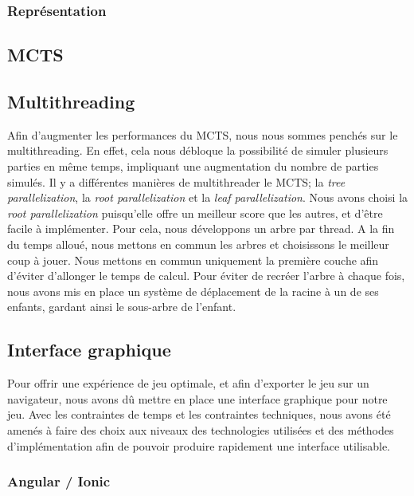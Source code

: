\documentclass[a4paper,11pt]{article}
\begin{document}
\hypertarget{repruxe9sentation}{%
\subsubsection{Représentation}\label{repruxe9sentation}}

\hypertarget{mcts}{%
\subsection{MCTS}\label{mcts}}

\hypertarget{multithreading}{%
\subsection{Multithreading}\label{multithreading}}

Afin d'augmenter les performances du MCTS, nous nous sommes penchés sur
le multithreading. En effet, cela nous débloque la possibilité de
simuler plusieurs parties en même temps, impliquant une augmentation du
nombre de parties simulés. Il y a différentes manières de multithreader
le MCTS; la \emph{tree parallelization}, la \emph{root parallelization}
et la \emph{leaf parallelization}. \citep{patel_blobs_2019} Nous avons
choisi la \emph{root parallelization} puisqu'elle offre un meilleur
score que les autres, et d'être facile à implémenter. Pour cela, nous
développons un arbre par thread. A la fin du temps alloué, nous mettons
en commun les arbres et choisissons le meilleur coup à jouer. Nous
mettons en commun uniquement la première couche afin d'éviter d'allonger
le temps de calcul. Pour éviter de recréer l'arbre à chaque fois, nous
avons mis en place un système de déplacement de la racine à un de ses
enfants, gardant ainsi le sous-arbre de l'enfant.

\hypertarget{interface-graphique}{%
\subsection{Interface graphique}\label{interface-graphique}}

Pour offrir une expérience de jeu optimale, et afin d'exporter le jeu
sur un navigateur, nous avons dû mettre en place une interface graphique
pour notre jeu. Avec les contraintes de temps et les contraintes
techniques, nous avons été amenés à faire des choix aux niveaux des
technologies utilisées et des méthodes d'implémentation afin de pouvoir
produire rapidement une interface utilisable.

\hypertarget{angular-ionic}{%
\subsubsection{Angular / Ionic}\label{angular-ionic}}
\end{document}
